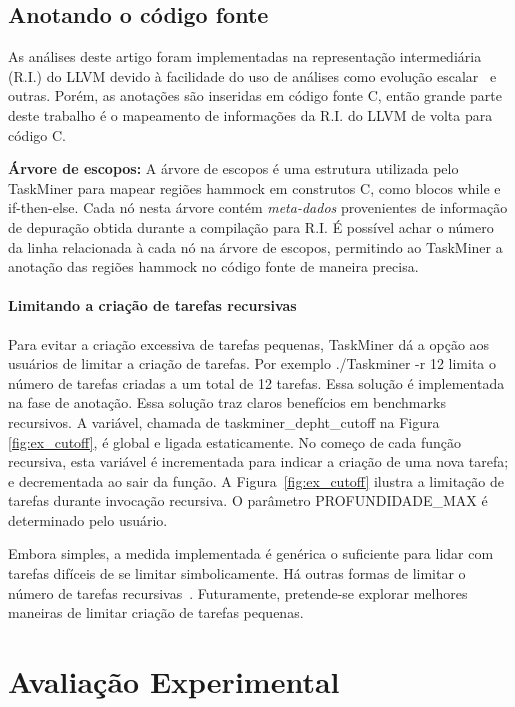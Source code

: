 \documentclass[sigplan,10pt,review]{acmart}
\newcommand\Taskminer{\mbox{\textsf{TaskMiner}}}
\begin{document}
\subsection{Anotando o código fonte}
\label{sub:ir}

As análises deste artigo foram implementadas na representação intermediária (R.I.)
do LLVM devido à facilidade do uso de análises como evolução escalar~\cite[p.18]{Grosser12} e outras.
Porém, as anotações são inseridas em código fonte C, então grande
parte deste trabalho é o mapeamento de informações da R.I. do LLVM de volta
para código C.

\noindent
\textbf{Árvore de escopos:}
A árvore de escopos é uma estrutura utilizada pelo {\Taskminer} para mapear regiões hammock em construtos C, como blocos
\textsf{while} e \textsf{if-then-else}. Cada nó nesta árvore contém {\em meta-dados}
provenientes de informação de depuração obtida durante a compilação para R.I.
É possível achar o número da linha relacionada à cada nó na árvore de escopos, permitindo
ao {\Taskminer} a anotação das regiões hammock no código fonte de maneira precisa.

\paragraph{Limitando a criação de tarefas recursivas}
Para evitar a criação excessiva de tarefas pequenas, {\Taskminer} dá a opção
aos usuários de limitar a criação de tarefas. Por exemplo \textsf{./Taskminer -r 12} limita o número
de tarefas criadas a um total de 12 tarefas. Essa solução é implementada na fase de anotação. 
Essa solução traz claros benefícios em benchmarks recursivos. 
A variável, chamada de \textsf{taskminer\_depht\_cutoff} na Figura
\ref{fig:ex_cutoff}, é global e ligada estaticamente. 
No começo de cada função recursiva,
esta variável é incrementada para indicar a criação de uma nova tarefa; 
e decrementada ao sair da função.
A Figura~\ref{fig:ex_cutoff} ilustra a limitação de tarefas 
durante invocação recursiva.
O parâmetro \textsf{PROFUNDIDADE\_MAX}
é determinado pelo usuário.

Embora simples, a medida implementada é genérica o suficiente para lidar com 
tarefas difíceis de se
limitar simbolicamente. 
Há outras formas de limitar o número de tarefas recursivas~\cite{Iwasaki16}.
Futuramente, 
pretende-se explorar melhores maneiras de
limitar criação de tarefas pequenas.

\section{Avalia\c{c}\~{a}o Experimental}
\label{sec:eval}
\end{document}
